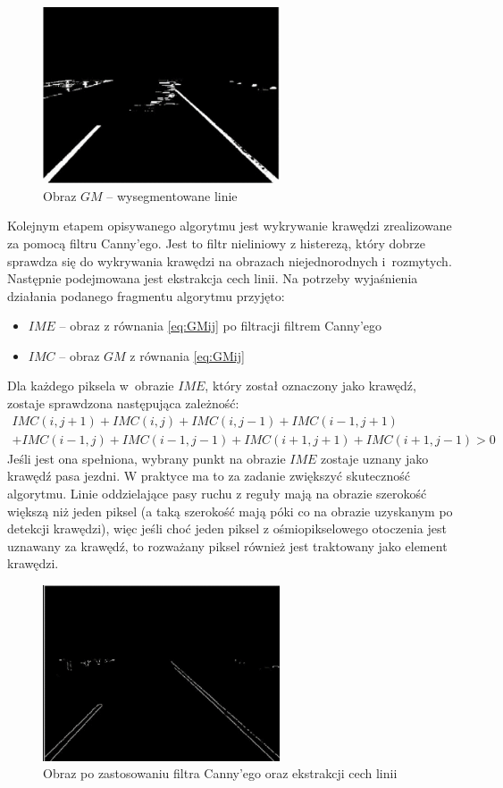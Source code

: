 \begin{figure}
  \centering
  \includegraphics[width=7cm]{img/segmentacja.png}
  \caption{Obraz $GM$ -- wysegmentowane linie\cite{T3}}
  \label{fig:segmented}
\end{figure}


Kolejnym etapem opisywanego algorytmu jest wykrywanie krawędzi zrealizowane za pomocą filtru Canny'ego. 
Jest to filtr nieliniowy z histerezą, który dobrze sprawdza się do wykrywania krawędzi na obrazach niejednorodnych i~rozmytych. 
Następnie podejmowana jest ekstrakcja cech linii. 
Na potrzeby wyjaśnienia działania podanego fragmentu algorytmu przyjęto:
\begin{itemize}
\item $IME$ -- obraz z równania \eqref{eq:GMij} po filtracji filtrem Canny'ego
\item $IMC$ -- obraz $GM$ z równania \eqref{eq:GMij}
\end{itemize}

Dla każdego piksela w~obrazie $IME$, który został oznaczony jako krawędź, zostaje sprawdzona następująca zależność:
\begin{equation}
	\begin{matrix}
	IMC(i,j+1)+IMC(i,j)+IMC(i,j-1)+IMC(i-1,j+1)\\
	+IMC(i-1,j)+IMC(i-1,j-1)+IMC(i+1,j+1)+IMC(i+1,j-1)>0
	\end{matrix}
\end{equation}
Jeśli jest ona spełniona, wybrany punkt na obrazie $IME$ zostaje uznany jako krawędź pasa jezdni.
W praktyce ma to za zadanie zwiększyć skuteczność algorytmu. 
Linie oddzielające pasy ruchu z reguły mają na obrazie szerokość większą niż jeden piksel (a taką szerokość mają póki co na obrazie uzyskanym po detekcji krawędzi), więc jeśli choć jeden piksel z ośmiopikselowego otoczenia jest uznawany za krawędź, to rozważany piksel również jest traktowany jako element krawędzi.

\begin{figure}
  \centering
  \includegraphics[width=7cm]{img/canny.png}
  \caption{Obraz po zastosowaniu filtra Canny'ego oraz ekstrakcji cech linii\cite{T3}}
  \label{fig:canny}
\end{figure}

